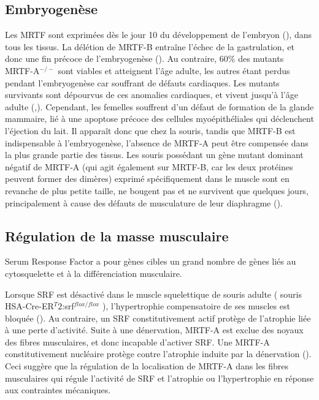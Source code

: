 \subsection{Embryogenèse}

Les MRTF sont exprimées dès le jour 10 du développement de l'embryon (\cite{wang_potentiation_2002}), dans tous les tissus. La délétion de MRTF-B entraîne l'échec de la gastrulation, et donc une fin précoce de l'embryogenèse (\cite{kalita_mkls:_2012}). Au contraire, 60\% des mutants MRTF-A$^{-/-}$ sont viables et atteignent l'âge adulte, les autres étant perdus pendant l'embryogenèse car souffrant de défauts cardiaques. Les mutants survivants sont dépourvus de ces anomalies cardiaques, et vivent jusqu'à l'âge adulte (\cite{li_requirement_2006},\cite{sun_acute_2006}). Cependant, les femelles souffrent d'un défaut de formation de la glande mammaire,  lié à une apoptose précoce des cellules myoépithéliales qui déclenchent l'éjection du lait. Il apparaît donc que chez la souris, tandis que MRTF-B est indispensable à l'embryogenèse, l'absence de MRTF-A peut être compensée dans la plus grande partie des tissus. 
Les souris possédant un gène mutant dominant négatif de MRTF-A (qui agit également sur MRTF-B, car les deux protéines peuvent former des dimères) exprimé spécifiquement dans le muscle sont en revanche de plus petite taille, ne bougent pas et ne survivent que quelques jours, principalement à cause des défauts de musculature de leur diaphragme (\cite{li_requirement_2005}). 

\subsection{Régulation de la masse musculaire}

Serum Response Factor a pour gènes cibles un grand nombre de gènes liés au cytosquelette et à la différenciation musculaire. 

Lorsque SRF est désactivé dans le muscle squelettique de souris adulte ( souris HSA-Cre-ER$^T2$:srf$^{flox/flox}$ ), l'hypertrophie compensatoire de ses muscles est bloquée (\cite{guerci_srf-dependent_2012}). Au contraire, un SRF constitutivement actif protège de l'atrophie liée à une perte d'activité. 
Suite à une dénervation, MRTF-A est exclue des noyaux des fibres musculaires, et donc incapable d'activer SRF. Une MRTF-A constitutivement nucléaire protège contre l'atrophie induite par la dénervation (\cite{collard_nuclear_2014}). Ceci suggère que la régulation de la localisation de MRTF-A dans les fibres musculaires qui régule l'activité de SRF et l'atrophie ou l'hypertrophie en réponse aux contraintes mécaniques.  


